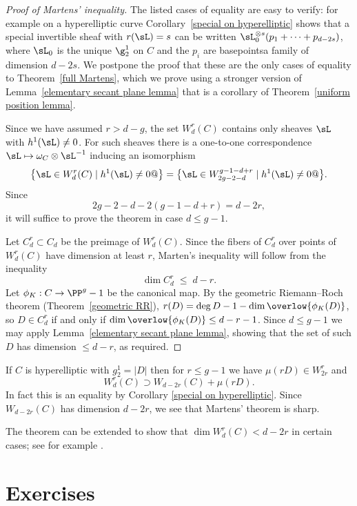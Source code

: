 \begin{proof}[Proof of Martens' inequality] 
 The listed cases of equality are easy to verify: for example on a hyperelliptic curve Corollary~\ref{special on hyperelliptic} shows that a special invertible sheaf with  $r(\sL) = s$ can be written $\sL_0^{\otimes s}(p_1+\cdots + p_{d-2s})$, where
$\sL_0$ is the unique $\g^1_2$ on $C$ and the $p_i$ are basepoints\emdash a family of dimension $d-2s$.
We postpone the proof that these are the only cases of equality to Theorem~\ref{full Martens}, which we prove
using a stronger version of Lemma~\ref{elementary secant plane lemma} that is a corollary of Theorem~\ref{uniform position lemma}. 

Since we have assumed $r>d-g$, the set $W^r_d(C)$ contains only  sheaves
 $\sL$ with $h^1(\sL)\neq 0$. For such sheaves there is a one-to-one 
correspondence $\sL \mapsto \omega_C\otimes \sL^{-1}$ inducing an isomorphism
$$
\bigl\{\sL \in W^r_d(C) \mid h^1(\sL) \neq 0 @\bigr\}= \bigl\{\sL \in W^{g-1-d+r}_{2g-2-d} \mid h^1(\sL) \neq 0 @\bigl\}
.
$$
Since
$$
2g-2-d - 2(g-1-d+r) = d-2r,
$$
it will suffice to prove the theorem in case $d \leq g-1$.

Let $C^r_d\subset C_d$ be the preimage of $W^r_d(C)$. Since the fibers of $C^r_d$ over points of
$W^r_d(C)$ have dimension at least $r$, Marten's inequality will follow from the inequality
$$
\dim C^r_d \; \leq \; d-r.
$$
\meshing
Let $\phi_K: C\to \PP^g-1$ be the canonical map. By the 
geometric Riemann--Roch theorem
%
%
(Theorem~\ref{geometric RR}),
$r(D) = \deg D -1 -\dim\overlow{\phi_K(D)}$, 
so $D\in C^r_d$ if and only if
$\dim \overlow{\phi_K(D)}\leq d-r-1$. Since $d\leq g-1$ we may apply  Lemma~\ref{elementary secant plane lemma}, showing that the set of such $D$ has dimension $\leq d-r$, as required.
\end{proof}


If $C$ is hyperelliptic with $g^1_2 = |D|$ then for $r\leq g-1$ we have $\mu(rD) \in W^r_{2r}$ and
$$
W^r_d(C) \supset W_{d-2r}(C) + \mu(rD).
$$
In fact this is an equality by
Corollary
\ref{special on hyperelliptic}. 
Since $W_{d-2r}(C)$ has dimension $d-2r$, we see that Martens' theorem is sharp. 

The theorem can be extended to show
%
that $\dim W^r_d(C) < d-2r$ in certain cases; 
see for example \cite{Mumford-Prym1,Keem,Coppens}.

\section{Exercises}


